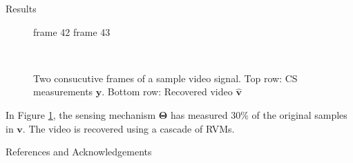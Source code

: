 \documentclass[final]{beamer}
\begin{document}
\begin{frame}{}
\begin{textblock}{19.5}
\begin{block}{Results}
\begin{figure}
\begin{minipage}{0.8\linewidth}
\scriptsize\hphantom{.}\hspace{2.5cm} frame 42 \hspace{3cm} frame 43
\end{minipage}\\
\begin{minipage}{0.95\linewidth}
\caption{Two consucutive frames of a sample video signal.
  Top row: CS measurements $\bm y$. 
  Bottom row: Recovered video $\bm{\hat v}$}
\label{fig}
\end{minipage}
\end{figure}
In Figure \ref{fig}, the sensing mechanism $\bm\Theta$ has measured 30\% of the original samples in $\bm v$. 
The video is recovered using a cascade of RVMs. %


\end{block}
\begin{block}{References and Acknowledgements}
\begin{minipage}{.9\linewidth}
     {     \printbibliography   %
     } 
\end{minipage}
\vspace{2ex}
\end{block}

\end{textblock}

\end{frame}
\end{document}
